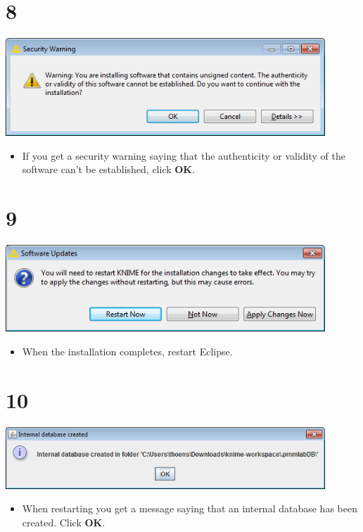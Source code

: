 \documentclass{beamer}
\begin{document}
\section{8}
\begin{frame}
	\begin{center}
  		\includegraphics[width=0.9\textwidth]{8.png}
	\end{center}
	\begin{itemize}
		\item If you get a security warning saying that the authenticity or validity of the software can't be established, click \textbf{OK}.
	\end{itemize}
\end{frame}

\section{9}
\begin{frame}
	\begin{center}
  		\includegraphics[width=0.9\textwidth]{9.png}
	\end{center}
	\begin{itemize}
		\item When the installation completes, restart Eclipse.
	\end{itemize}
\end{frame}

\section{10}
\begin{frame}
	\begin{center}
  		\includegraphics[width=0.9\textwidth]{10.png}
	\end{center}
	\begin{itemize}
		\item When restarting you get a message saying that an internal database has been created. Click \textbf{OK}.
	\end{itemize}
\end{frame}
\end{document}

